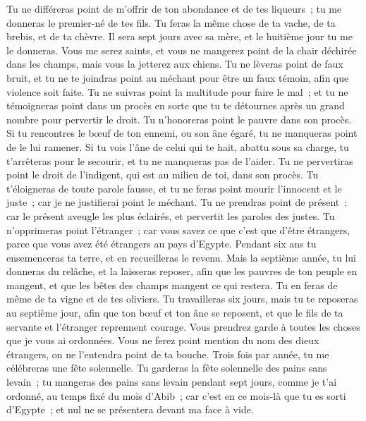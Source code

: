 \begin{multicols}{2}
Tu ne différeras point de m'offrir de ton abondance et de tes liqueurs~; tu me donneras le premier-né de tes fils.
Tu feras la même chose de ta vache, de ta brebis, et de ta chèvre. Il sera sept jours avec sa mère, et le huitième jour tu me le donneras.
Vous me serez saints, et vous ne mangerez point de la chair déchirée dans les champs, mais vous la jetterez aux chiens.
\VerseOne{}Tu ne lèveras point de faux bruit, et tu ne te joindras point au méchant pour être un faux témoin, afin que violence soit faite.
Tu ne suivras point la multitude pour faire le mal~; et tu ne témoigneras point dans un procès en sorte que tu te détournes après un grand nombre pour pervertir le droit.
Tu n'honoreras point le pauvre dans son procès.
Si tu rencontres le bœuf de ton ennemi, ou son âne égaré, tu ne manqueras point de le lui ramener.
Si tu vois l'âne de celui qui te hait, abattu sous sa charge, tu t'arrêteras pour le secourir, et tu ne manqueras pas de l'aider.
Tu ne pervertiras point le droit de l'indigent, qui est au milieu de toi, dans son procès.
Tu t'éloigneras de toute parole fausse, et tu ne feras point mourir l'innocent et le juste~; car je ne justifierai point le méchant.
Tu ne prendras point de présent~; car le présent aveugle les plus éclairés, et pervertit les paroles des justes.
Tu n'opprimeras point l'étranger~; car vous savez ce que c'est que d'être étrangers, parce que vous avez été étrangers au pays d'Egypte.
Pendant six ans tu ensemenceras ta terre, et en recueilleras le revenu.
Mais la septième année, tu lui donneras du relâche, et la laisseras reposer, afin que les pauvres de ton peuple en mangent, et que les bêtes des champs mangent ce qui restera. Tu en feras de même de ta vigne et de tes oliviers.
Tu travailleras six jours, mais tu te reposeras au septième jour, afin que ton bœuf et ton âne se reposent, et que le fils de ta servante et l'étranger reprennent courage.
Vous prendrez garde à toutes les choses que je vous ai ordonnées. Vous ne ferez point mention du nom des dieux étrangers, on ne l'entendra point de ta bouche.
Trois fois par année, tu me célébreras une fête solennelle.
Tu garderas la fête solennelle des pains sans levain~; tu mangeras des pains sans levain pendant sept jours, comme je t'ai ordonné, au temps fixé du mois d'Abib~; car c'est en ce mois-là que tu es sorti d'Egypte~; et nul ne se présentera devant ma face à vide.

\end{multicols}

